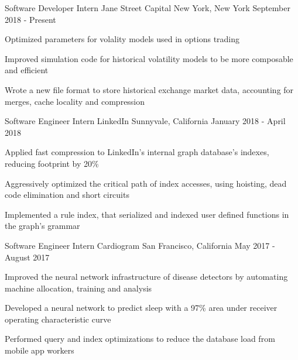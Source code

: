 


\begin{cventries}


\cventry
{Software Developer Intern}
{Jane Street Capital}
{New York, New York}
{September 2018 - Present}
{ %
\begin{cvitems}
\item {Optimized parameters for volality models used in options trading}
\item {Improved simulation code for historical volatility models to be more composable and efficient}
\item {Wrote a new file format to store historical exchange market data,
      accounting for merges, cache locality and compression}
\end{cvitems}
}


\cventry
{Software Engineer Intern}
{LinkedIn}
{Sunnyvale, California}
{January 2018 - April 2018}
{ %
\begin{cvitems}
\item {Applied fast compression to LinkedIn's internal graph database's indexes, reducing footprint by 20\%}
\item {Aggressively optimized the critical path of index accesses,
      using hoisting, dead code elimination and short circuits}
\item {Implemented a rule index, that serialized and indexed user defined functions in the graph's grammar}
\end{cvitems}
}


\cventry
{Software Engineer Intern}
{Cardiogram}
{San Francisco, California}
{May 2017 - August 2017}
{ %
\begin{cvitems}
\item {Improved the neural network infrastructure of disease detectors by automating machine allocation, training and analysis}
\item {Developed a neural network to predict sleep with a 97\% area under receiver operating characteristic curve}
\item {Performed query and index optimizations to reduce the database load from mobile app workers}
\end{cvitems}
}


\end{cventries}
